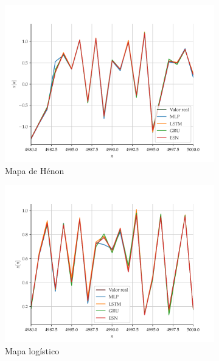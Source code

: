 \documentclass[a4paper, 12pt]{article}
\begin{document}
\begin{figure}[H]
     \begin{subfigure}[t]{0.4\textwidth} 
         \includegraphics[scale=0.35]{vs-henon-zoom.pdf}
         \caption{Mapa de Hénon}
     \end{subfigure}
     \centering
     \begin{subfigure}[t]{0.4\textwidth} 
         \includegraphics[scale=0.35]{vs-logistic-zoom.pdf}
         \caption{Mapa logístico}
     \end{subfigure}
     \centering
     \\
     \begin{subfigure}[t]{0.4\textwidth} 

\end{subfigure}
\end{figure}
\end{document}
